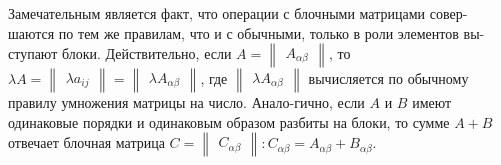   Замечательным является факт, что операции с блочными матрицами совер-шаются по тем же правилам, что и с обычными, только в роли элементов вы-ступают блоки. Действительно, если
  $A=\begin{Vmatrix}
    A_{\alpha \beta}
  \end{Vmatrix}$, то $\lambda A = \begin{Vmatrix}
\lambda a_{ij}
  \end{Vmatrix} = \begin{Vmatrix}
    \lambda A_{\alpha \beta}
  \end{Vmatrix}$, где $\begin{Vmatrix}
    \lambda A_{\alpha \beta}
  \end{Vmatrix}$ вычисляется по обычному правилу умножения матрицы на число. Анало-гично, если $A$ и $B$ имеют одинаковые порядки и одинаковым образом разбиты на блоки, то сумме $A +B$ отвечает блочная матрица $C=\begin{Vmatrix}
  C_{\alpha \beta}
  \end{Vmatrix} : C_{\alpha \beta} = A_{\alpha \beta} + B_{\alpha \beta}$.

